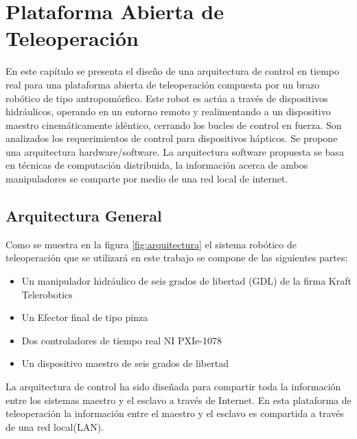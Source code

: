 \chapter{Plataforma Abierta de Teleoperación}
\begin{flushright}
\begin{minipage}{0,7\textwidth}
En este cap\'itulo se presenta el diseño de una arquitectura de control en tiempo real para una plataforma abierta de teleoperación compuesta por un brazo robótico de tipo antropomórfico. Este robot es actúa a través de dispositivos hidráulicos, operando en un entorno remoto y realimentando a un dispositivo maestro cinemáticamente idéntico, cerrando los bucles de control en fuerza. Son analizados los requerimientos de control para dispositivos hápticos. Se propone una arquitectura hardware/software. La arquitectura software propuesta se basa en técnicas de computación distribuida, la información acerca de ambos manipuladores se comparte por medio de una red local de internet.
\end{minipage}
\end{flushright}




\newpage
\section{Arquitectura General}

Como se muestra en la figura \ref{fig:arquitectura} el sistema robótico de teleoperación que se utilizar\'a en este trabajo se compone de las siguientes partes:\\

\begin{itemize}
\item Un manipulador hidráulico de seis grados de libertad (GDL) de la firma Kraft Telerobotics\textregistered
\item Un Efector final de tipo pinza
\item Dos controladores de tiempo real NI PXIe-1078
\item Un dispositivo maestro de seis grados de libertad
\end{itemize}

La arquitectura de control ha sido diseñada para compartir toda la información entre los sistemas maestro y el esclavo a través de Internet. En esta plataforma de teleoperación la información entre el maestro y el esclavo es compartida a través de una red local(LAN).\\


